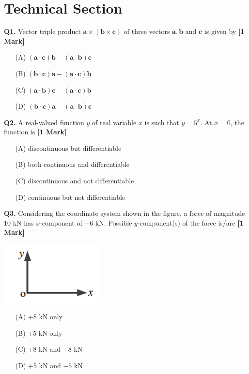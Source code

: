 \documentclass[11pt]{article}
\newcommand{\questiona}[2]{
    \noindent\textbf{Q#2.} #1 \hfill \textbf{[1 Mark]}
}
\begin{document}
\section*{Technical Section}

\questiona{Vector triple product \( \mathbf{a} \times (\mathbf{b} \times \mathbf{c}) \) of three vectors \( \mathbf{a}, \mathbf{b} \) and \( \mathbf{c} \) is given by}{1}
\begin{enumerate}
    \item[(A)] \( (\mathbf{a} \cdot \mathbf{c})\mathbf{b} - (\mathbf{a} \cdot \mathbf{b})\mathbf{c} \)
    \item[(B)] \( (\mathbf{b} \cdot \mathbf{c})\mathbf{a} - (\mathbf{a} \cdot \mathbf{c})\mathbf{b} \)
    \item[(C)] \( (\mathbf{a} \cdot \mathbf{b})\mathbf{c} - (\mathbf{a} \cdot \mathbf{c})\mathbf{b} \)
    \item[(D)] \( (\mathbf{b} \cdot \mathbf{c})\mathbf{a} - (\mathbf{a} \cdot \mathbf{b})\mathbf{c} \)
\end{enumerate}
\vspace{0.5cm}

\questiona{A real-valued function \( y \) of real variable \( x \) is such that \( y = 5^x \). At \( x = 0 \), the function is}{2}
\begin{enumerate}
    \item[(A)] discontinuous but differentiable
    \item[(B)] both continuous and differentiable
    \item[(C)] discontinuous and not differentiable
    \item[(D)] continuous but not differentiable
\end{enumerate}
\vspace{0.5cm}

\questiona{Considering the coordinate system shown in the figure, a force of magnitude 10 kN has \( x \)-component of \(-6\) kN. Possible \( y \)-component(s) of the force is/are}{3}
\begin{center}
\includegraphics[width=0.4\textwidth]{figures/3.png}
\end{center}
\begin{enumerate}
    \item[(A)] +8 kN only
    \item[(B)] +5 kN only
    \item[(C)] +8 kN and \(-8\) kN
    \item[(D)] +5 kN and \(-5\) kN
\end{enumerate}
\vspace{0.5cm}
\end{document}
